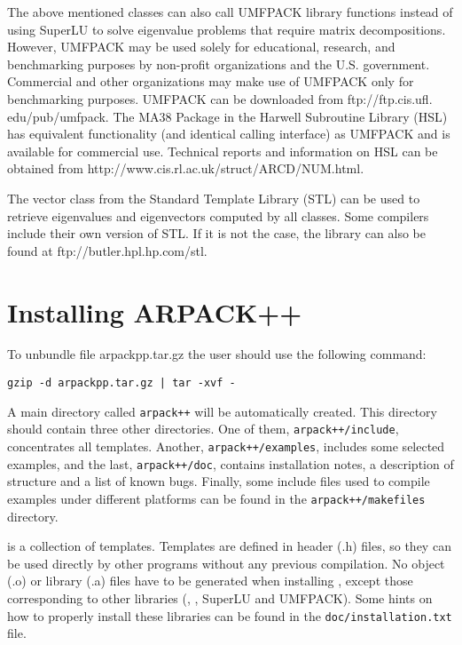 The above mentioned classes can also call UMFPACK library functions instead of using SuperLU to solve eigenvalue problems that require matrix decompositions. However, UMFPACK may be used solely for educational, research, and benchmarking purposes by non-profit organizations and the U.S. government. Commercial and other organizations may make use of UMFPACK only for benchmarking purposes. UMFPACK can be downloaded from ftp://ftp.cis.ufl. edu/pub/umfpack. The MA38 Package in the Harwell Subroutine Library (HSL) has equivalent functionality (and identical calling interface) as UMFPACK and is available for commercial use. Technical reports and information on HSL can be obtained from http://www.cis.rl.ac.uk/struct/ARCD/NUM.html.

The vector class from the Standard Template Library (STL) can be used to retrieve eigenvalues and eigenvectors computed by all \ARPP{} classes. Some compilers include their own version of STL. If it is not the case, the library can also be found at ftp://butler.hpl.hp.com/stl.

\section{Installing ARPACK++}

To unbundle file arpackpp.tar.gz the user should use the following command:
\begin{verbatim}
gzip -d arpackpp.tar.gz | tar -xvf -
\end{verbatim}
A main directory called \texttt{arpack++} will be automatically created. This directory should contain three other directories. One of them, \texttt{arpack++/include}, concentrates all \ARPP{} templates. Another, \texttt{arpack++/examples}, includes some selected examples, and the last, \texttt{arpack++/doc}, contains installation notes, a description of \ARPP{} structure and a list of known bugs. Finally, some include files used to compile \ARPP{} examples under different platforms can be found in the \texttt{arpack++/makefiles} directory.

\ARPP{} is a collection of templates. Templates are defined in header (.h) files, so they can be used directly by other programs without any previous compilation. No object (.o) or library (.a) files have to be generated when installing \ARPP{}, except those corresponding to other libraries (\ARP{}, \LAP{}, SuperLU and UMFPACK). Some hints on how to properly install these libraries can be found in the \texttt{doc/installation.txt} file.


